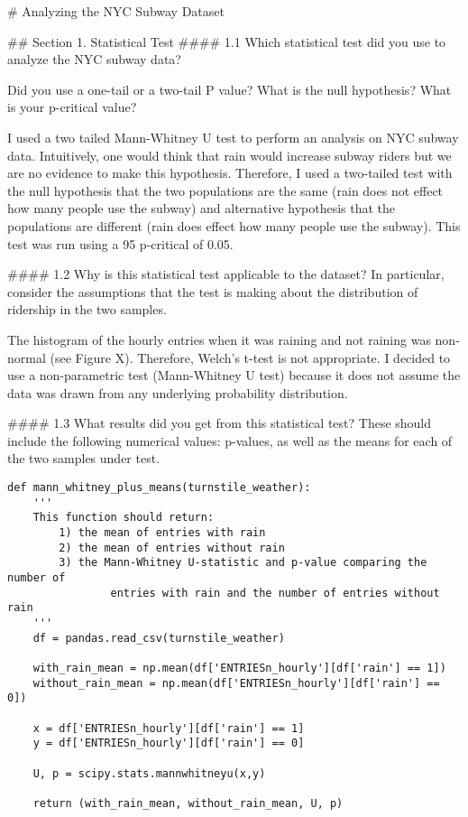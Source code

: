 

# Analyzing the NYC Subway Dataset

## Section 1. Statistical Test
#### 1.1 Which statistical test did you use to analyze the NYC subway data? 

Did you use a one-tail or a two-tail P value? What is the null hypothesis? 
What is your p-critical value?

I used a two tailed Mann-Whitney U test to perform an analysis on NYC \n
subway data. Intuitively, one would think that rain would increase subway \n
riders but we are no evidence to make this hypothesis. Therefore, I used a \n
two-tailed test with the null hypothesis that the two populations are the \n
same (rain does not effect how many people use the subway) and alternative \n
hypothesis that the populations are different (rain does effect how many \n
people use the subway). This test was run using a 95%
p-critical of 0.05. \n

#### 1.2 Why is this statistical test applicable to the dataset? In particular, consider the assumptions that the test is making about the distribution of ridership in the two samples.

The histogram of the hourly entries when it was raining and not raining was
non-normal (see Figure X). Therefore, Welch’s t-test is not appropriate. 
I decided to use a non-parametric test (Mann-Whitney U test) because it 
does not assume the data was drawn from any underlying probability 
distribution.

#### 1.3 What results did you get from this statistical test? These should include the following numerical values: p-values, as well as the means for each of the two samples under test.





\begin{verbatim}
def mann_whitney_plus_means(turnstile_weather):
    '''
    This function should return:
        1) the mean of entries with rain
        2) the mean of entries without rain
        3) the Mann-Whitney U-statistic and p-value comparing the
number of
                entries with rain and the number of entries without
rain
    '''
    df = pandas.read_csv(turnstile_weather)

    with_rain_mean = np.mean(df['ENTRIESn_hourly'][df['rain'] == 1])
    without_rain_mean = np.mean(df['ENTRIESn_hourly'][df['rain'] ==
0])

    x = df['ENTRIESn_hourly'][df['rain'] == 1]
    y = df['ENTRIESn_hourly'][df['rain'] == 0]

    U, p = scipy.stats.mannwhitneyu(x,y)

    return (with_rain_mean, without_rain_mean, U, p)
\end{verbatim}


